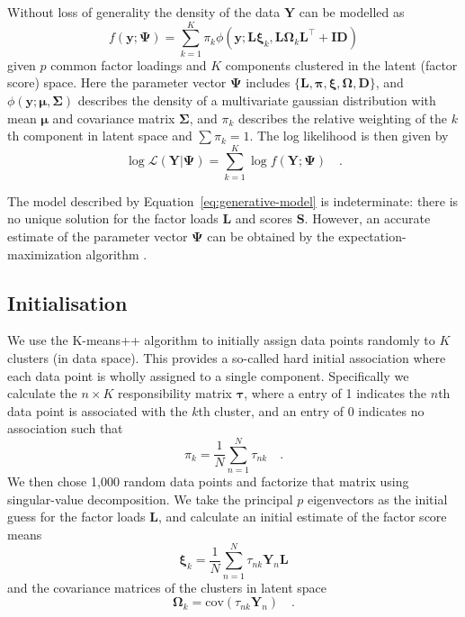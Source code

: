 \documentclass[twocolumn]{aastex61}
\newcommand{\vect}[1]{\boldsymbol{\mathbf{#1}}}
\renewcommand{\vec}[1]{\vect{#1}}
\newcommand{\weight}{\pi}
\newcommand{\data}{\textbf{Y}}
\newcommand{\vecdata}{\vec\data}
\newcommand{\transpose}{^\intercal}
\newcommand{\eye}{\textbf{I}}
\newcommand{\factorloads}{\textbf{L}}
\newcommand{\factorscores}{\textbf{S}}
\newcommand{\specificvariance}{\vec{D}}
\newcommand{\scoremeans}{\vec\xi}
\newcommand{\scorecovs}{\vec\Omega}
\begin{document}
Without loss of generality the density of the data $\vecdata$ can be modelled as
\begin{equation}
	f(\textbf{y}; \vec\Psi) = \sum_{k=1}^{K}\weight_{k}\phi(\textbf{y};\factorloads\scoremeans_k, \factorloads\scorecovs_k\factorloads\transpose + \eye\specificvariance)
\end{equation}
\noindent{}given $p$ common factor loadings and $K$ components
clustered in the latent (factor score) space. Here the parameter
vector
$\vec\Psi$ includes $\{\factorloads,\vec\pi,\scoremeans,\scorecovs,\specificvariance\}$, and $\phi(\textbf{y};\vec\mu, \vec\Sigma)$
describes the density of a multivariate gaussian distribution with
mean $\vec\mu$ and covariance matrix $\vec\Sigma$,
and $\weight_k$ describes the relative weighting of the $k$th
component in latent space and $\sum\weight_k = 1$.
The log likelihood is then given by
\begin{equation}
	\log\mathcal{L}(\vecdata|\vec\Psi) = \sum_{k=1}^{K}\log{f(\vecdata;\vec\Psi)} \quad .
\end{equation}


The model described by Equation~\ref{eq:generative-model} is indeterminate:
there is no unique solution for the factor loads $\factorloads$ and scores
$\factorscores$. However, an accurate estimate of the parameter vector $\vec\Psi$ can be obtained by the expectation-maximization algorithm \citep{EM}. 



\subsection{Initialisation}

We use the K-means++ algorithm to initially assign data points
randomly to $K$ clusters (in data space). This provides a so-called
hard initial association where each data point is wholly assigned
to a single component. Specifically we calculate the $n \times K$
responsibility matrix $\vec\tau$, where a entry of 1 indicates the
$n$th data point is associated with the $k$th cluster, and an
entry of 0 indicates no association such that
\begin{equation}
	\weight_k = \frac{1}{N}\sum_{n=1}^{N}\tau_{nk} \quad .
\end{equation}
We then chose 1,000
random data points and factorize that matrix using singular-value
decomposition. We take the principal $p$ eigenvectors as the 
initial guess for the factor loads $\factorloads$, and calculate
an initial estimate of the factor score means
\begin{equation}
	\scoremeans_k = \frac{1}{N}\sum_{n=1}^{N}\tau_{nk}\vecdata_{n}\factorloads
\end{equation}
\noindent{}and the covariance matrices of the clusters in latent space
\begin{equation}
	\scorecovs_k = \textrm{cov}{\left(\tau_{nk}\vecdata_{n}\right)} \quad .
\end{equation}
\end{document}
